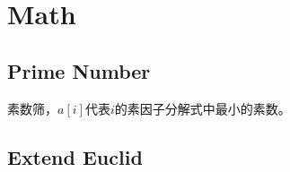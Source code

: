 \section{Math}
	\subsection{Prime Number}
		\begin{flushleft}
			素数筛，$a[i]$代表$i$的素因子分解式中最小的素数。
		\end{flushleft}
		
	\subsection{Extend Euclid}
		